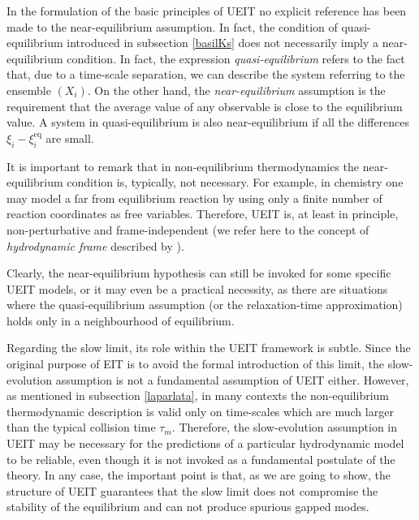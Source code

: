 \documentclass[a4paper, amsfonts, amssymb, amsmath, reprint, twocolumn, showkeys, nofootinbib]{revtex4-2}
\begin{document}
In the formulation of the basic principles of UEIT no explicit reference has been made to the near-equilibrium assumption. 
In fact, the condition of quasi-equilibrium introduced in subsection \ref{basilKs} does not necessarily imply a near-equilibrium condition. In fact, the expression \textit{quasi-equilibrium} refers to the fact that, due to a time-scale separation, we can describe the system referring to the ensemble $(X_i)$. On the other hand, the \textit{near-equilibrium} assumption is the requirement that the average value of any observable is close to the equilibrium value. A system in quasi-equilibrium is also near-equilibrium if all the differences $\xi_i-\xi_i^{\text{eq}}$ are small. 

It is important to remark that in non-equilibrium thermodynamics the near-equilibrium condition is, typically, not necessary. For example, in chemistry one may 
%
model a far from equilibrium reaction  by using only a finite number of reaction coordinates as free variables.
Therefore, UEIT is, at least in principle, non-perturbative and frame-independent (we refer here to the concept of \textit{hydrodynamic frame} described by \citet{Kovtun2019}).

Clearly, the near-equilibrium hypothesis can still be invoked for some specific UEIT models, or it may even be a practical necessity, as there are situations where the quasi-equilibrium assumption (or the relaxation-time approximation) holds only in a neighbourhood of equilibrium.  

Regarding the slow limit, its role within  the UEIT framework is subtle. Since the original purpose of EIT is to avoid the formal introduction of this limit, the slow-evolution assumption is not a fundamental assumption of UEIT either. However, as mentioned in subsection \ref{laparlata}, in many contexts the non-equilibrium thermodynamic description is valid only on time-scales which are much larger than the typical collision time $\tau_m$. Therefore, the slow-evolution assumption in UEIT may be necessary for the predictions of a particular hydrodynamic model to be reliable, even though it is not invoked as a fundamental postulate of the theory. In any case, the important point is that, as we are going to show, the structure of UEIT guarantees that the slow limit does not compromise the stability of the equilibrium and can not produce spurious gapped modes.
\end{document}
